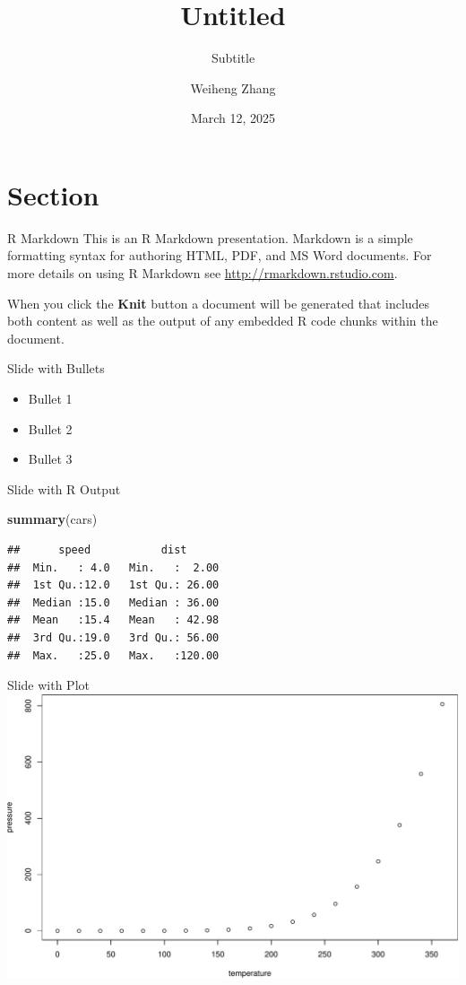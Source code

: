 \documentclass[
  ignorenonframetext,
]{beamer}
\title{Untitled}
\subtitle{Subtitle}
\author{Weiheng Zhang}
\date{March 12, 2025}
\newenvironment{Shaded}{\begin{snugshade}}{\end{snugshade}}
\newcommand{\FunctionTok}[1]{\textcolor[rgb]{0.13,0.29,0.53}{\textbf{#1}}}
\newcommand{\NormalTok}[1]{#1}
\providecommand{\tightlist}{%
  \setlength{\itemsep}{0pt}\setlength{\parskip}{0pt}}
\begin{document}
\frame{\titlepage}

\hypertarget{section}{%
\section{Section}\label{section}}

\begin{frame}{R Markdown}
\protect\hypertarget{r-markdown}{}
This is an R Markdown presentation. Markdown is a simple formatting
syntax for authoring HTML, PDF, and MS Word documents. For more details
on using R Markdown see \url{http://rmarkdown.rstudio.com}.

When you click the \textbf{Knit} button a document will be generated
that includes both content as well as the output of any embedded R code
chunks within the document.
\end{frame}

\begin{frame}{Slide with Bullets}
\protect\hypertarget{slide-with-bullets}{}
\begin{itemize}
\tightlist
\item
  Bullet 1
\item
  Bullet 2
\item
  Bullet 3
\end{itemize}
\end{frame}

\begin{frame}[fragile]{Slide with R Output}
\protect\hypertarget{slide-with-r-output}{}
\begin{Shaded}
\begin{Highlighting}[]
\FunctionTok{summary}\NormalTok{(cars)}
\end{Highlighting}
\end{Shaded}

\begin{verbatim}
##      speed           dist       
##  Min.   : 4.0   Min.   :  2.00  
##  1st Qu.:12.0   1st Qu.: 26.00  
##  Median :15.0   Median : 36.00  
##  Mean   :15.4   Mean   : 42.98  
##  3rd Qu.:19.0   3rd Qu.: 56.00  
##  Max.   :25.0   Max.   :120.00
\end{verbatim}
\end{frame}

\begin{frame}{Slide with Plot}
\protect\hypertarget{slide-with-plot}{}
\includegraphics{skeleton_files/figure-beamer/pressure-1.pdf}
\end{frame}
\end{document}
